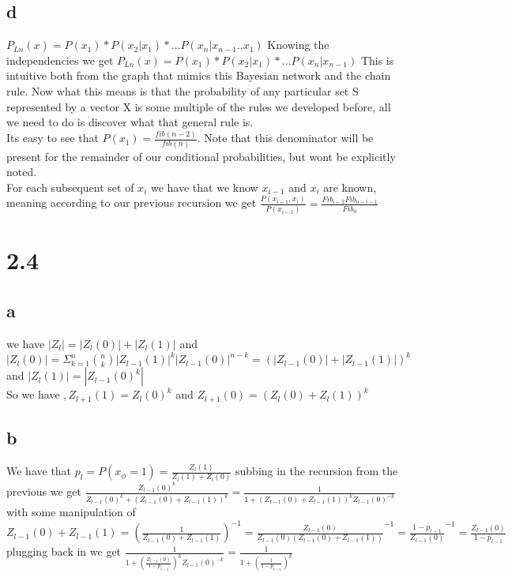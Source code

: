 \documentclass[12pt]{article}
\begin{document}
\subsection{d}
$P_{Ln}(x) = P(x_1)*P(x_2|x_1)*...P(x_n|x_{n-1}..x_1)$ Knowing the independencies we get $P_{Ln}(x) = P(x_1)*P(x_2|x_1)*...P(x_n|x_{n-1})$ This is intuitive both from the graph that mimics this Bayesian network and the chain rule. Now what this means is that the probability of any particular set S represented by a vector X is some multiple of the rules we developed before, all we need to do is discover what that general rule is.
\\
Its easy to see that $P(x_1) = \frac{fib(n-2)}{fib(n)}$. Note that this denominator will be present for the remainder of our conditional probabilities, but wont be explicitly noted.
\\
For each subsequent set of $x_i$ we have that we know $x_{i-1}$ and $x_i$ are known, meaning according to our previous recursion we get $\frac{P(x_{i-1},x_i)}{P(x_{i-1})} = \frac{Fib_{i-2}Fib_{n-i-1 }}{Fib_{n}} $

\section{2.4}
\subsection{a}

we have $|Z_{l}| = |Z_{l}(0)| + |Z_{l}(1)|$ and $|Z_l(0)| = \Sigma_{k=1}^n \binom{n}{k} |Z_{l-1}(1)|^{k}|Z_{l-1}(0)|^{n-k} = (|Z_{l-1}(0)| + |Z_{l-1}(1)|)^k$ and $|Z_l(1)| = |Z_{l-1}(0)^k|$
\\
So we have $,Z_{l+1}(1) = Z_{l}(0)^k$ and $Z_{l+1}(0) = (Z_{l}(0) + Z_{l}(1))^k$
\subsection{b}
We have that $p_l=P(x_\phi = 1) = \frac{Z_{l}(1)}{Z_{l}(1)+Z_{l}(0)}$ subbing in the recursion from the previous we get $\frac{Z_{l-1}(0)^k}{Z_{l-1}(0)^k+ (Z_{l-1}(0) + Z_{l-1}(1))^k} =  \frac{1}{1+(Z_{l-1}(0) + Z_{l-1}(1))^k Z_{l-1}(0)^{-k}} $ with some manipulation of  $Z_{l-1}(0) + Z_{l-1}(1) = (\frac{1}{Z_{l-1}(0) + Z_{l-1}(1)})^{-1} = \frac{Z_{l-1}(0)}{Z_{l-1}(0)(Z_{l-1}(0) + Z_{l-1}(1))} ^{-1} = \frac{1-p_{l-1}}{Z_{l-1}(0)} ^{-1} = \frac{Z_{l-1}(0)}{1-p_{l-1}}$ plugging back in we get $\frac{1}{1+(\frac{Z_{l-1}(0)}{1-p_{l-1}})^k Z_{l-1}(0)^{-k}}  = \frac{1}{1+(\frac{1}{1-p_{l-1}})^k} $
\end{document}

